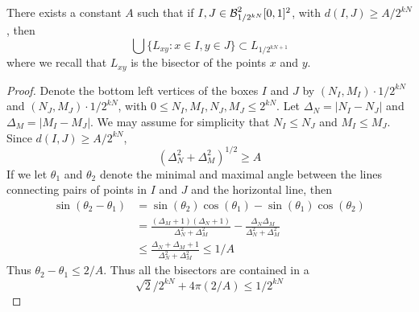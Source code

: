 \begin{lemma}
	There exists a constant $A$ such that if $I, J \in \operatorname{\mathcal{B}}^2_{1/2^{kN}}[0,1]^2$, with $d(I,J) \geq A/2^{kN}$, then
	\[ \bigcup \{ L_{xy}: x \in I, y \in J \} \subset L_{1/2^{kN+1}} \]
	where we recall that $L_{xy}$ is the bisector of the points $x$ and $y$.
\end{lemma}
\begin{proof}
	Denote the bottom left vertices of the boxes $I$ and $J$ by $(N_I,M_I) \cdot 1/2^{kN}$ and $(N_J,M_J) \cdot 1/2^{kN}$, with $0 \leq N_I,M_I,N_J,M_J \leq 2^{kN}$. Let $\Delta_N = |N_I - N_J|$ and $\Delta_M = |M_I - M_J|$. We may assume for simplicity that $N_I \leq N_J$ and $M_I \leq M_J$. Since $d(I,J) \geq A/2^{kN}$,
	\[ (\Delta_N^2 + \Delta_M^2)^{1/2} \geq A \]
	If we let $\theta_1$ and $\theta_2$ denote the minimal and maximal angle between the lines connecting pairs of points in $I$ and $J$ and the horizontal line, then
	\begin{align*}
		\sin(\theta_2 - \theta_1) &= \sin(\theta_2) \cos(\theta_1) - \sin(\theta_1) \cos(\theta_2)\\
		&= \frac{(\Delta_M + 1)(\Delta_N + 1)}{\Delta_N^2 + \Delta_M^2} - \frac{\Delta_N \Delta_M}{\Delta_N^2 + \Delta_M^2}\\
		&\leq \frac{\Delta_N + \Delta_M + 1}{\Delta_N^2 + \Delta_M^2} \leq 1/A
	\end{align*}
	Thus $\theta_2 - \theta_1 \leq 2/A$. Thus all the bisectors are contained in a
	\[ \sqrt{2}/2^{kN} + 4\pi(2/A) \leq 1/2^{kN} \]
\end{proof}

